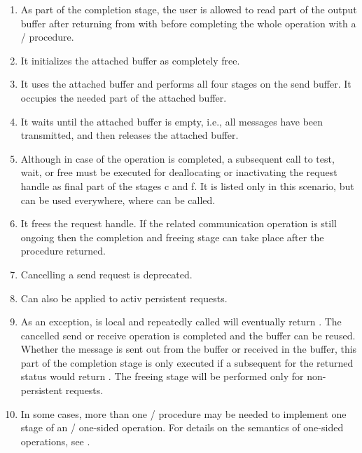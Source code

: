 {\begin{enumerate}
\item \label{semantics:item21} As part of the completion stage, the user is allowed to read part of the output buffer after returning
from  with  before completing the whole operation with a / procedure.
\item \label{semantics:item22} It initializes the attached buffer as completely free.
\item \label{semantics:item23} It uses the attached buffer and performs all four stages on the send buffer. It occupies the needed part of the attached buffer. 
\item \label{semantics:item24} It waits until the attached buffer is empty, i.e., all messages have been transmitted, and then releases the attached buffer.
\item \label{semantics:item25} Although in case of  the operation is completed,
  a subsequent call to test, wait, or free must be executed for deallocating or inactivating
  the request handle as final part of the stages c and f. It is listed only in this scenario,
  but can be used everywhere, where  can be called.
\item \label{semantics:item26} It frees the request handle. If the related communication
  operation is still ongoing then the completion and freeing stage can take place after the
  procedure returned.
\item \label{semantics:item27} Cancelling a send request is deprecated.
\item \label{semantics:item28} Can also be applied to activ persistent requests.
\item \label{semantics:item29} As an exception,  is local and
   repeatedly called will eventually return .
  The cancelled send or receive operation is completed and the buffer can be reused. Whether the message is sent out from the buffer or received in the buffer, this part of the completion stage is only executed if a subsequent
   for the returned status would
  return .
  The freeing stage will be performed only for non-persistent requests.
\item \label{semantics:item30} In some cases, more than one \MPI/ procedure may be 
  needed to implement one stage of an \MPI/ one-sided operation.
  For details on the semantics of one-sided operations, see .

\end{enumerate}}
